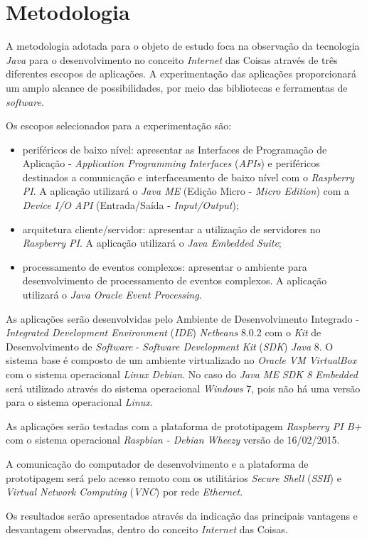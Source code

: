 %

\chapter{Metodologia}

A metodologia adotada para o objeto de estudo foca na observação da tecnologia 
\textit{Java} para o desenvolvimento no conceito \textit{Internet} das Coisas 
através de três diferentes escopos de aplicações. A experimentação das 
aplicações proporcionará um amplo alcance de possibilidades, por meio das 
bibliotecas e ferramentas de \textit{software}.

Os escopos selecionados para a experimentação são:

\begin{itemize}
    
	\item periféricos de baixo nível: apresentar as Interfaces de Programação 
	de Aplicação - \textit{Application Programming Interfaces} (\textit{APIs}) 
	e periféricos destinados a comunicação e interfaceamento de baixo nível com 
	o \textit{Raspberry PI}. A aplicação utilizará o \textit{Java ME} (Edição 
	Micro - \textit{Micro Edition}) com a \textit{Device I/O API} 
	(Entrada/Saída - \textit{Input/Output});
    
	\item arquitetura cliente/servidor: apresentar a utilização de servidores 
	no \textit{Raspberry PI}. A aplicação utilizará o \textit{Java Embedded 
	Suite};
    
	\item processamento de eventos complexos: apresentar o ambiente para 
	desenvolvimento de processamento de eventos complexos. A aplicação 
	utilizará o \textit{Java Oracle Event Processing}.
    
\end{itemize}

As aplicações serão desenvolvidas pelo Ambiente de Desenvolvimento Integrado -  
\textit{Integrated Development Environment} (\textit{IDE}) \textit{Netbeans} 
8.0.2 com o \textit{Kit} de Desenvolvimento de \textit{Software} - 
\textit{Software Development Kit} (\textit{SDK}) \textit{Java} 8. O sistema 
base é composto de um ambiente virtualizado no \textit{Oracle VM VirtualBox} 
com o sistema operacional \textit{Linux Debian}. No caso do \textit{Java ME SDK 
8 Embedded} será utilizado através do sistema operacional \textit{Windows} 7, 
pois não há uma versão para o sistema operacional \textit{Linux}.

As aplicações serão testadas com a plataforma de prototipagem \textit{Raspberry 
PI B+} com o sistema operacional \textit{Raspbian - Debian Wheezy} versão de 
16/02/2015.

A comunicação do computador de desenvolvimento e a plataforma de prototipagem 
será pelo acesso remoto com os utilitários \textit{Secure Shell} (\textit{SSH}) 
e \textit{Virtual Network Computing} (\textit{VNC}) por rede \textit{Ethernet}.

Os resultados serão apresentados através da indicação das principais vantagens 
e desvantagem observadas, dentro do conceito \textit{Internet} das Coisas.
